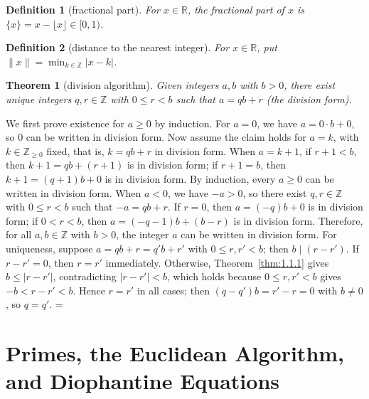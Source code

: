 \documentclass[11pt]{article}
\makeatletter
\let\nt@closedisplay\]
\def\nt@guardedclose{\@ifnextchar\par{\nt@closeafterpar}{\@ifnextchar\end{\postdisplaypenalty\@M\nt@closedisplay}{\nt@closedisplay}}}
\def\nt@closeafterpar\par{\@ifnextchar\par{\nt@closeafterpar}{\@ifnextchar\end{\postdisplaypenalty\@M\nt@closedisplay\par}{\nt@closedisplay\par}}}
\renewenvironment{proof}[1][\proofname]{\par
  \pushQED{\qed}\normalfont\topsep\medskipamount\edef\nt@afterproof{\@endparpenalty=\the\@endparpenalty\relax}\@beginparpenalty\@M\@endparpenalty\@M\let\]\nt@guardedclose\trivlist\item[]\textit{#1\@addpunct{.}} \ignorespaces}{\ifvmode\addpenalty\@M\fi\popQED\nt@afterproof\endtrivlist\@endpefalse}
\theoremstyle{ntstyle}
\newtheorem{theorem}{Theorem}[subsection]
\newtheorem{definition}{Definition}[subsection]
\makeatother
\begin{document}
\begin{definition}[fractional part]\label{def:1.2.3}\label{def:fractional-part} For
  $x\in\mathbb{R}$, the fractional part of $x$ is
  $\{x\}=x-\lfloor x\rfloor\in[0,1)$.

\end{definition}

\begin{definition}[distance to the nearest integer]\label{def:1.2.4}\label{def:distance-to-the-nearest-integer}
  For $x\in\mathbb{R}$, put
  $\lVert x\rVert=\min_{k\in\mathbb{Z}}|x-k|$.

\end{definition}

\begin{theorem}[division algorithm]\label{thm:1.2.1}\label{thm:division-algorithm}
  Given integers
  $a, b$ with $b > 0$, there exist unique integers $q, r \in \mathbb{Z}$
  with $0 \le r < b$ such that $a = qb + r$ (the division form).

\end{theorem}

\begin{proof} We first prove existence for $a\ge0$ by induction. For $a = 0$, we have $a = 0 \cdot b + 0$, so $0$ can be written in division form. Now
  assume the claim holds for $a = k$, with $k \in \mathbb{Z}_{\ge0}$ fixed, that is, $k = qb + r$ in division form.
  When $a = k+1$,
  if $r + 1 < b$, then $k+1 = qb + (r+1)$ is in division form; if $r+1 = b$, then $k+1 = (q+1)b + 0$ is in division
  form. By induction,
  every $a \ge 0$ can be written in division form. When $a < 0$, we
  have $-a > 0$, so there exist $q, r \in \mathbb{Z}$ with $0 \le r < b$ such that $-a = qb + r$. If $r = 0$, then
  $a = (-q)b + 0$ is in
  division form; if $0 < r < b$, then $a = (-q-1)b + (b - r)$ is in
  division form. Therefore, for all $a, b \in \mathbb{Z}$ with $b > 0$,
  the integer $a$ can be written in division form. For uniqueness, suppose $a = qb + r = q'b + r'$ with
  $0 \le r, r' < b$; then $b \mid (r-r')$. If $r-r'=0$, then $r=r'$ immediately. Otherwise, Theorem~\ref{thm:1.1.1}
  gives $b\le |r-r'|$, contradicting $|r-r'|<b$, which holds because $0\le r,r'<b$ gives $-b<r-r'<b$. Hence $r=r'$
  in all cases; then $(q-q')b=r'-r=0$ with $b\neq0$, so $q=q'$.
\end{proof}
\newpage


\section{Primes, the Euclidean Algorithm, and Diophantine Equations}
\end{document}
